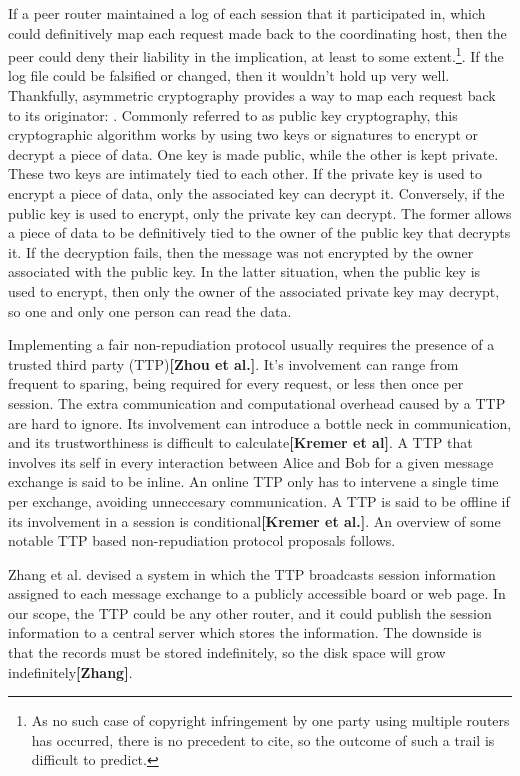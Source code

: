 \documentclass[12pt]{article}
\newcommand{\lcite}[1]
{{\bfseries\color{orange}[#1]}}
\begin{document}
			If a peer router maintained a log of each session that it participated in, which could definitively map each request made back to the coordinating host, then the peer could deny their liability in the implication, at least to some extent.\footnote{As no such case of copyright infringement by one party using multiple routers has occurred, there is no precedent to cite, so the outcome of such a trail is difficult to predict.}. If the log file could be falsified or changed, then it wouldn't hold up very well. Thankfully, asymmetric cryptography provides a way to map each request back to its originator: . Commonly referred to as public key cryptography, this cryptographic algorithm works by using two keys or signatures to encrypt or decrypt a piece of data. One key is made public, while the other is kept private. These two keys are intimately tied to each other. If the private key is used to encrypt a piece of data, only the associated key can decrypt it. Conversely, if the public key is used to encrypt, only the private key can decrypt. The former allows a piece of data to be definitively tied to the owner of the public key that decrypts it. If the decryption fails, then the message was not encrypted by the owner associated with the public key. In the latter situation, when the public key is used to encrypt, then only the owner of the associated private key may decrypt, so one and only one person can read the data.

			Implementing a fair non-repudiation protocol usually requires the presence of a trusted third party (TTP)\lcite{Zhou et al.}. It's involvement can range from frequent to sparing, being required for every request, or less then once per session. The extra communication and computational overhead caused by a TTP are hard to ignore. Its involvement can introduce a bottle neck in communication, and its trustworthiness is difficult to calculate\lcite{Kremer et al}. A TTP that involves its self in every interaction between Alice and Bob for a given message exchange is said to be inline. An online TTP only has to intervene a single time per exchange, avoiding unneccesary communication. A TTP is said to be offline if its involvement in a session is conditional\lcite{Kremer et al.}. An overview of some notable TTP based non-repudiation protocol proposals follows. 

			Zhang et al. devised a system in which the TTP broadcasts session information assigned to each message exchange to a publicly accessible board or web page. In our scope, the TTP could be any other router, and it could publish the session information to a central server which stores the information. The downside is that the records must be stored indefinitely, so the disk space will grow indefinitely\lcite{Zhang}.
\end{document}

